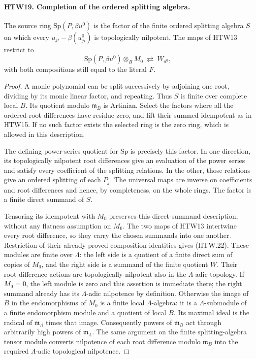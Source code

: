 \paragraph{HTW19. Completion of the ordered splitting algebra.}
\label{claim:HTW19}
The source ring \(\mathrm{Sp}(P,\beta u^0)\) is the
factor of the finite ordered splitting algebra \(S\)
on which every \(u_{ji}-\beta(u^0_{ji})\) is
topologically nilpotent.  The maps of HTW13 restrict
to
\[
 \mathrm{Sp}(P,\beta u^0)\otimes_BM_0
          \ \rightleftarrows\ W_{u^0},
 \tag{HTW.22}
\]
with both compositions still equal to the literal \(F\).
\begin{proof}
A monic polynomial can be split successively by
adjoining one root, dividing by its monic linear
factor, and repeating.  Thus \(S\) is finite over
complete local \(B\).  Its quotient modulo
\(\mathfrak m_B\) is Artinian.  Select the factors
where all the ordered root differences have
residue zero, and lift their summed idempotent as
in HTW15.  If no such factor exists the selected
ring is the zero ring, which is allowed in this
description.

The defining power-series quotient for
\(\mathrm{Sp}\) is precisely this factor.  In one
direction, its topologically nilpotent root
differences give an evaluation of the power series
and satisfy every coefficient of the splitting
relations.  In the other, those relations give an
ordered splitting of each \(P_j\).  The universal
maps are inverse on coefficients and root
differences and hence, by completeness, on the
whole rings.  The factor is a finite direct summand
of \(S\).

Tensoring its idempotent with \(M_0\) preserves this
direct-summand description, without any flatness
assumption on \(M_0\).  The two maps of HTW13
intertwine every root difference, so they carry
the chosen summands into one another.  Restriction
of their already proved composition identities
gives (HTW.22).  These modules are finite over
\(\Lambda\): the left side is a quotient of a
finite direct sum of copies of \(M_0\), and the
right side is a summand of the finite quotient \(W\).
Their root-difference actions are topologically
nilpotent also in the \(\Lambda\)-adic topology.
If \(M_0=0\), the left module is zero and this
assertion is immediate there; the right summand
already has its \(\Lambda\)-adic nilpotence by
definition.  Otherwise the image of \(B\) in the endomorphisms
of \(M_0\) is a finite local \(\Lambda\)-algebra:
it is a \(\Lambda\)-submodule of a finite
endomorphism module and a quotient of local \(B\).
Its maximal ideal is the radical of
\(\mathfrak m_\Lambda\) times that image.
Consequently powers of \(\mathfrak m_B\)
act through arbitrarily high powers of
\(\mathfrak m_\Lambda\).  The same argument
on the finite splitting-algebra tensor module
converts nilpotence of each root difference
modulo \(\mathfrak m_B\) into the required
\(\Lambda\)-adic topological nilpotence.
\end{proof}

